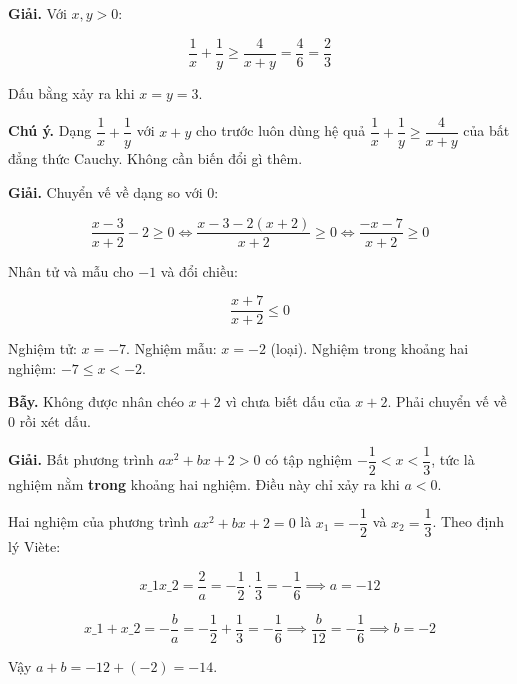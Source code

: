 \documentclass[11pt, a4paper]{article}
\begin{document}
\begin{dapan}[19 — Đáp án C]
\textbf{Giải.} Với $x, y > 0$:

$$\frac{1}{x} + \frac{1}{y} \ge \frac{4}{x+y} = \frac{4}{6} = \frac{2}{3}$$

Dấu bằng xảy ra khi $x = y = 3$.

\textbf{Chú ý.} Dạng $\dfrac{1}{x} + \dfrac{1}{y}$ với $x + y$ cho trước luôn dùng hệ quả $\dfrac{1}{x} + \dfrac{1}{y} \ge \dfrac{4}{x+y}$ của bất đẳng thức Cauchy. Không cần biến đổi gì thêm.
\end{dapan}

\begin{dapan}[20 — Đáp án C]
\textbf{Giải.} Chuyển vế về dạng so với $0$:

$$\frac{x-3}{x+2} - 2 \ge 0 \iff \frac{x-3-2(x+2)}{x+2} \ge 0 \iff \frac{-x-7}{x+2} \ge 0$$

Nhân tử và mẫu cho $-1$ và đổi chiều:

$$\frac{x+7}{x+2} \le 0$$

Nghiệm tử: $x = -7$. Nghiệm mẫu: $x = -2$ (loại). Nghiệm trong khoảng hai nghiệm: $-7 \le x < -2$.

\textbf{Bẫy.} Không được nhân chéo $x+2$ vì chưa biết dấu của $x+2$. Phải chuyển vế về $0$ rồi xét dấu.
\end{dapan}

\begin{dapan}[21 — Đáp án A]
\textbf{Giải.} Bất phương trình $ax^2 + bx + 2 > 0$ có tập nghiệm $-\dfrac{1}{2} < x < \dfrac{1}{3}$, tức là nghiệm nằm \textbf{trong} khoảng hai nghiệm. Điều này chỉ xảy ra khi $a < 0$.

Hai nghiệm của phương trình $ax^2 + bx + 2 = 0$ là $x_1 = -\dfrac{1}{2}$ và $x_2 = \dfrac{1}{3}$. Theo định lý Viète:

$$x\_1 x\_2 = \frac{2}{a} = -\frac{1}{2} \cdot \frac{1}{3} = -\frac{1}{6} \implies a = -12$$

$$x\_1 + x\_2 = -\frac{b}{a} = -\frac{1}{2} + \frac{1}{3} = -\frac{1}{6} \implies \frac{b}{12} = -\frac{1}{6} \implies b = -2$$

Vậy $a + b = -12 + (-2) = -14$.
\end{dapan}
\end{document}
